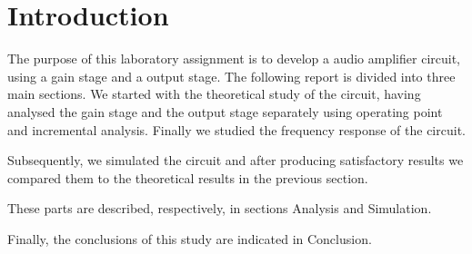 \section{Introduction}
\label{sec:introduction}

The purpose of this laboratory assignment is to develop a audio amplifier 
circuit, using a gain stage and a output stage. 
The following report is divided into three main sections.
We started with the theoretical study of the circuit, having analysed
the gain stage and the output stage separately using operating point and 
incremental analysis. Finally we studied the frequency response of the circuit.

Subsequently, we simulated the circuit and after producing satisfactory 
results we compared them to the theoretical results in the previous section.

These parts are described, respectively, in sections Analysis 
and Simulation.

Finally, the conclusions of this study are indicated in Conclusion.

